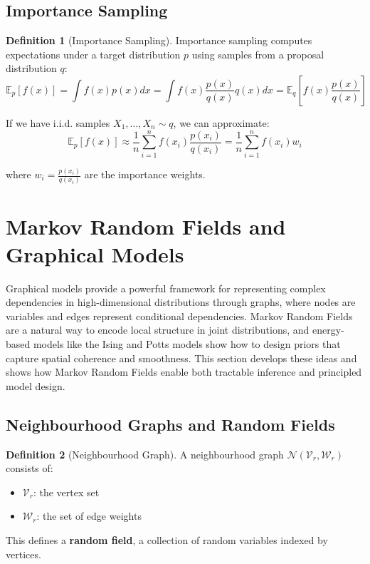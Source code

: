 \documentclass[12pt,a4paper]{article}
\theoremstyle{definition}
\newtheorem{definition}{Definition}[section]
\begin{document}
\subsection{Importance Sampling}

\begin{definition}[Importance Sampling]
Importance sampling computes expectations under a target distribution $p$ using samples from a proposal distribution $q$:
\[
\mathbb{E}_p[f(x)] = \int f(x) p(x) dx = \int f(x) \frac{p(x)}{q(x)} q(x) dx = \mathbb{E}_q\left[f(x) \frac{p(x)}{q(x)}\right]
\]

If we have i.i.d. samples $X_1, \ldots, X_n \sim q$, we can approximate:
\[
\mathbb{E}_p[f(x)] \approx \frac{1}{n} \sum_{i=1}^n f(x_i) \frac{p(x_i)}{q(x_i)} = \frac{1}{n} \sum_{i=1}^n f(x_i) w_i
\]

where $w_i = \frac{p(x_i)}{q(x_i)}$ are the importance weights.
\end{definition}

\newpage


\section{Markov Random Fields and Graphical Models}

Graphical models provide a powerful framework for representing complex dependencies in high-dimensional distributions through graphs, where nodes are variables and edges represent conditional dependencies. Markov Random Fields are a natural way to encode local structure in joint distributions, and energy-based models like the Ising and Potts models show how to design priors that capture spatial coherence and smoothness. This section develops these ideas and shows how Markov Random Fields enable both tractable inference and principled model design.

\subsection{Neighbourhood Graphs and Random Fields}

\begin{definition}[Neighbourhood Graph]
A neighbourhood graph $\mathcal{N}(\mathcal{V}_r, \mathcal{W}_r)$ consists of:
\begin{itemize}
    \item $\mathcal{V}_r$: the vertex set
    \item $\mathcal{W}_r$: the set of edge weights
\end{itemize}
This defines a \textbf{random field}, a collection of random variables indexed by vertices.
\end{definition}
\end{document}
